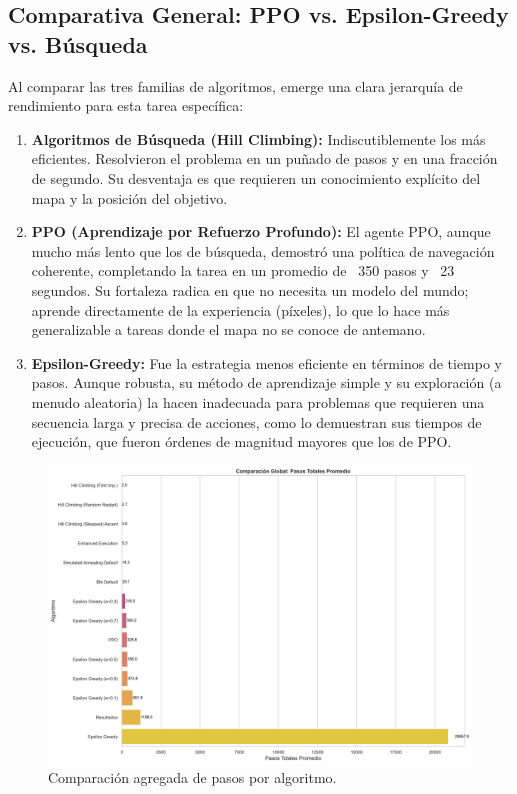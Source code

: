 \documentclass[12pt, oneside, openany]{book}
\begin{document}
\subsection{Comparativa General: PPO vs. Epsilon-Greedy vs. Búsqueda}
Al comparar las tres familias de algoritmos, emerge una clara jerarquía de rendimiento para esta tarea específica:
\begin{enumerate}
    \item \textbf{Algoritmos de Búsqueda (Hill Climbing):} Indiscutiblemente los más eficientes. Resolvieron el problema en un puñado de pasos y en una fracción de segundo. Su desventaja es que requieren un conocimiento explícito del mapa y la posición del objetivo.
    \item \textbf{PPO (Aprendizaje por Refuerzo Profundo):} El agente PPO, aunque mucho más lento que los de búsqueda, demostró una política de navegación coherente, completando la tarea en un promedio de ~350 pasos y ~23 segundos. Su fortaleza radica en que no necesita un modelo del mundo; aprende directamente de la experiencia (píxeles), lo que lo hace más generalizable a tareas donde el mapa no se conoce de antemano.
    \item \textbf{Epsilon-Greedy:} Fue la estrategia menos eficiente en términos de tiempo y pasos. Aunque robusta, su método de aprendizaje simple y su exploración (a menudo aleatoria) la hacen inadecuada para problemas que requieren una secuencia larga y precisa de acciones, como lo demuestran sus tiempos de ejecución, que fueron órdenes de magnitud mayores que los de PPO.
\end{enumerate}



\begin{figure}[H]
    \centering
    \includegraphics[width=1\textwidth]{master_pasos_comparacion.png}
    \caption{Comparación agregada de pasos por algoritmo.}
    \label{fig:master_pasos}
\end{figure}
\end{document}
